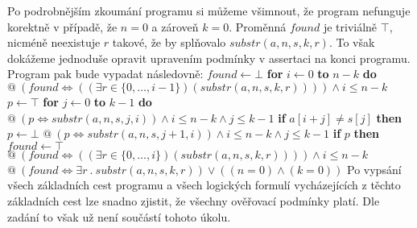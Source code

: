 \documentclass{article}
\newcommand\tab[1][0.5cm]{\hspace*{#1}}
\begin{document}
Po podrobnějším zkoumání programu si můžeme všimnout, že program nefunguje korektně v případě, že $n = 0$ a zároveň $k = 0$. Proměnná $found$ je triviálně $\top$, nicméně neexistuje $r$ takové, že by splňovalo $substr(a, n, s, k, r)$. To však dokážeme jednoduše opravit upravením podmínky v assertaci na konci programu. Program pak bude vypadat následovně: \newline\newline $found \leftarrow \bot$ \newline \textbf{for} $i \leftarrow 0$ \textbf{to} $n - k$ \textbf{do} \newline \tab $@\ (found \Leftrightarrow ((\exists r \in \{0,\dots,i - 1\}) (substr(a, n, s, k, r)))) \wedge i \leq n - k$ \newline \tab $p \leftarrow \top$ \newline \tab \textbf{for} $j \leftarrow 0$ \textbf{to} $k - 1$ \textbf{do} \newline \tab \tab $@\ (p \Leftrightarrow substr( a, n, s, j, i )) \wedge i \leq n - k \wedge j \leq k - 1$ \newline \tab \tab \textbf{if} $a[i+j] \neq s[j]$ \textbf{then} \newline \tab \tab \tab $p \leftarrow \bot$ \newline \tab \tab $@\ (p \Leftrightarrow substr( a, n, s, j + 1, i )) \wedge i \leq n - k \wedge j \leq k - 1$ \newline \tab \textbf{if} $p$ \textbf{then} $found \leftarrow \top$ \newline \tab $@\ (found \Leftrightarrow ((\exists r \in \{0,\dots,i\}) (substr(a, n, s, k, r)))) \wedge i \leq n - k$ \newline $@\ (found  \Leftrightarrow \exists r\ .\ substr(a, n, s, k, r)) \lor ((n = 0) \wedge (k = 0) )$ \newline\newline
Po vypsání všech základních cest programu a všech logických formulí vycházejících z těchto základních cest lze snadno zjistit, že všechny ověřovací podmínky platí. Dle zadání to však už není součástí tohoto úkolu.
\end{document}
